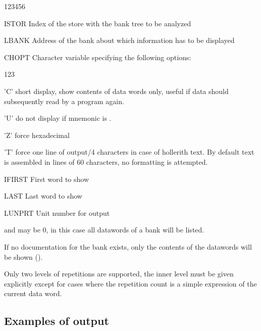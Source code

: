 \begin{DLtt}{123456}
\item[ISTOR]  Index of the store with the bank tree to be analyzed
\item[LBANK]  Address of the bank about which information has to be displayed
\item[CHOPT]  Character variable specifying the following options:
  \begin{DLtt}{123}
     \item['C'] short display, show contents of data words only,
                useful if data should subsequently read by a program again.
     \item['U'] do not display if mnemonic is .
     \item['Z'] force hexadecimal
     \item['T'] force one line of output/4 characters in case of
                hollerith text. By default text is assembled in lines
                of 60 characters, no formatting is attempted.
  \end{DLtt}
\item[IFIRST] First word to show
\item[LAST]   Last word to show
\item[LUNPRT] Unit number for output
\end{DLtt}
 
\begin{Notes}
\item {} and  may be 0, in this case all datawords
      of a bank will be listed. 
\item If no documentation for the bank exists, only the contents of the 
      datawords will be shown ().
\item Only two levels of repetitions are supported, the inner level
      must be given explicitly except for cases where the repetition count
      is a simple expression of the current data word.
\end{Notes}
 
\newpage
 
\subsection[Examples of {\tt DZDISP} output]{Examples of  output}
 
